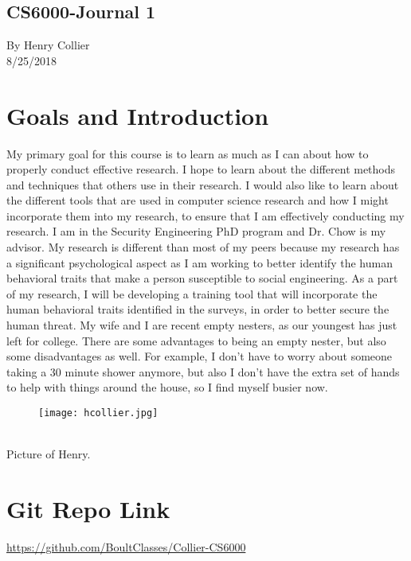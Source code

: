 \documentclass[12pt]{article}
\begin{document}
\begin {center}
\section*{CS6000-Journal 1}
By Henry Collier
\\
8/25/2018
\end {center}

\section*{Goals and Introduction}
My primary goal for this course is to learn as much as I can about how to properly conduct effective research.  I hope to learn about the different methods and techniques that others use in their research. I would also like to learn about the different tools that are used in computer science research and how I might incorporate them into my research, to ensure that I am effectively conducting my research. I am in the Security Engineering PhD program and Dr. Chow is my advisor.  My research is different than most of my peers because my research has a significant psychological aspect as I am working to better identify the human behavioral traits that make a person susceptible to social engineering.  As a part of my research, I will be developing a training tool that will incorporate the human behavioral traits identified in the surveys, in order to better secure the human threat. My wife and I are recent empty nesters, as our youngest has just left for college. There are some advantages to being an empty nester, but also some disadvantages as well. For example, I don't have to worry about someone taking a 30 minute shower anymore, but also I don't have the extra set of hands to help with things around the house, so I find myself busier now. 
\begin{figure}[ht!]
\texttt{[image: hcollier.jpg]}
\end{figure}
\\
Picture of Henry.
\section*{Git Repo Link}
\url{https://github.com/BoultClasses/Collier-CS6000}
\end{document}
